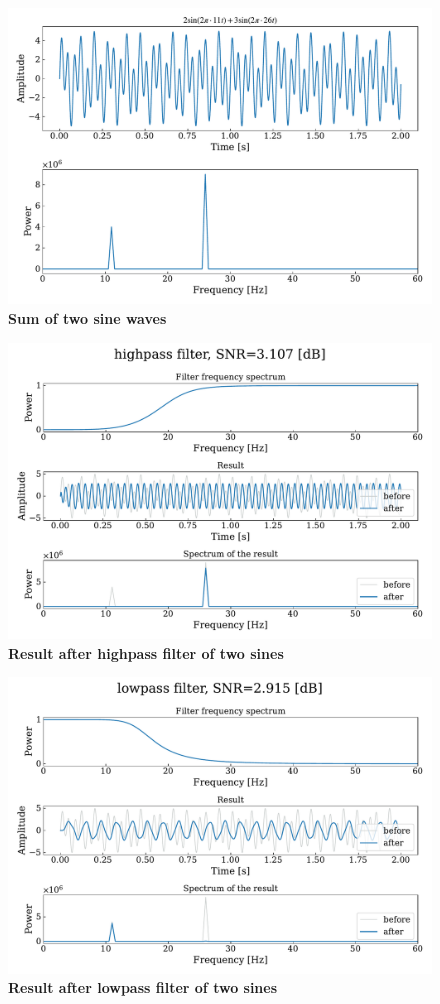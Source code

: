 \documentclass[13pt,a4paper]{article}
\begin{document}
\begin{figure}[ht!]
    \centering
    \caption{\textbf{Sum of two sine waves}}
    \includegraphics[width=0.9\linewidth]{two_sin.pdf}
\end{figure}

\begin{figure}[ht!]
    \centering
    \caption{\textbf{Result after highpass filter of two sines}}
    \includegraphics[width=0.9\linewidth]{filter_two_sin.highpass.pdf}
\end{figure}

\begin{figure}[ht!]
    \centering
    \caption{\textbf{Result after lowpass filter of two sines}}
    \includegraphics[width=0.9\linewidth]{filter_two_sin.lowpass.pdf}
\end{figure}
\end{document}
